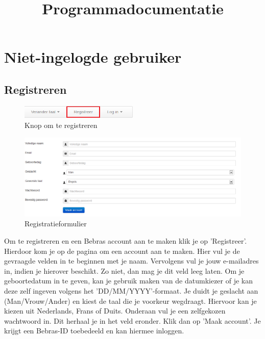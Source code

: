 \documentclass[]{article}
\title{
    Programmadocumentatie
}
\author{}
\date{}
\begin{document}
\maketitle

\tableofcontents
\clearpage

\section{Niet-ingelogde gebruiker}

\subsection{Registreren}

\begin{figure}[!ht]
	\centering
	\includegraphics[width=0.5\textwidth]{img/registreerknop}
	\caption{Knop om te registreren}
	\label{registreerknop}
\end{figure}

\begin{figure}[!ht]
	\centering
	\includegraphics[width=1\textwidth]{img/registerform}
	\caption{Registratieformulier}
	\label{registerform}
\end{figure}

Om te registreren en een Bebras account aan te maken klik je op 'Registreer'. Hierdoor kom je op de pagina om een account aan te maken. Hier vul je de gevraagde velden in te beginnen met je naam. Vervolgens vul je jouw e-mailadres in, indien je hierover beschikt. Zo niet, dan mag je dit veld leeg laten. Om je geboortedatum in te geven, kan je gebruik maken van de datumkiezer of je kan deze zelf ingeven volgens het 'DD/MM/YYYY'-formaat. Je duidt je geslacht aan (Man/Vrouw/Ander) en kiest de taal die je voorkeur wegdraagt. Hiervoor kan je kiezen uit Nederlands, Frans of Duits. Onderaan vul je een zelfgekozen wachtwoord in. Dit herhaal je in het veld eronder. Klik dan op 'Maak account'. Je krijgt een Bebras-ID toebedeeld en kan hiermee inloggen.
\end{document}
